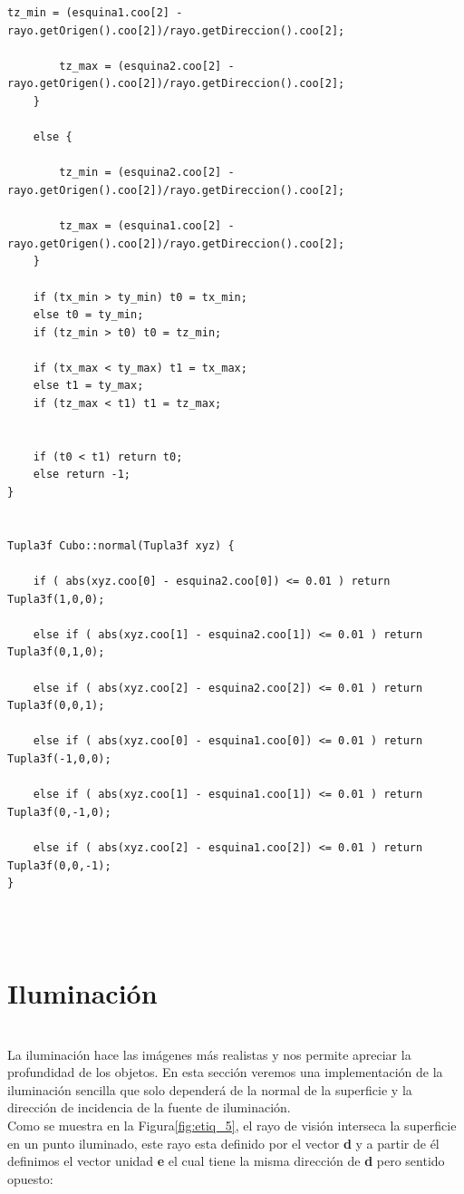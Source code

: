 \begin{lstlisting}[style=Consola]
		tz_min = (esquina1.coo[2] - rayo.getOrigen().coo[2])/rayo.getDireccion().coo[2];
		
		tz_max = (esquina2.coo[2] - rayo.getOrigen().coo[2])/rayo.getDireccion().coo[2];
	}
	
	else {
	
		tz_min = (esquina2.coo[2] - rayo.getOrigen().coo[2])/rayo.getDireccion().coo[2];
		
		tz_max = (esquina1.coo[2] - rayo.getOrigen().coo[2])/rayo.getDireccion().coo[2];
	}

	if (tx_min > ty_min) t0 = tx_min;
	else t0 = ty_min;
	if (tz_min > t0) t0 = tz_min;

	if (tx_max < ty_max) t1 = tx_max;
	else t1 = ty_max;
	if (tz_max < t1) t1 = tz_max;


	if (t0 < t1) return t0;
	else return -1;
}


Tupla3f Cubo::normal(Tupla3f xyz) {

	if ( abs(xyz.coo[0] - esquina2.coo[0]) <= 0.01 ) return Tupla3f(1,0,0);
	
	else if ( abs(xyz.coo[1] - esquina2.coo[1]) <= 0.01 ) return Tupla3f(0,1,0);
	
	else if ( abs(xyz.coo[2] - esquina2.coo[2]) <= 0.01 ) return Tupla3f(0,0,1);
	
	else if ( abs(xyz.coo[0] - esquina1.coo[0]) <= 0.01 ) return Tupla3f(-1,0,0);
	
	else if ( abs(xyz.coo[1] - esquina1.coo[1]) <= 0.01 ) return Tupla3f(0,-1,0);
	
	else if ( abs(xyz.coo[2] - esquina1.coo[2]) <= 0.01 ) return Tupla3f(0,0,-1);
}
\end{lstlisting}
${ }$\\

${ }$\\
\section{Iluminación}
${ }$\\

La iluminación hace las imágenes más realistas y nos permite apreciar la profundidad de los objetos. En esta sección veremos una implementación de la iluminación sencilla que solo dependerá de la normal de la superficie y la dirección de incidencia de la fuente de iluminación. 
${ }$\\

Como se muestra en la Figura\ref{fig:etiq_5}, el rayo de visión interseca la superficie en un punto iluminado, este rayo esta definido por el vector \textbf{d} y a partir de él definimos el vector unidad \textbf{e} el cual tiene la misma dirección de \textbf{d} pero sentido opuesto:
${ }$\\

